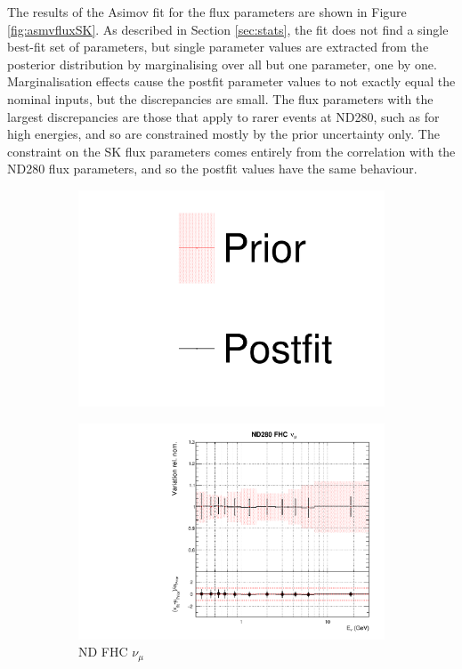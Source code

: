 The results of the Asimov fit for the flux parameters are shown in Figure \ref{fig:asmvfluxSK}. As described in Section \ref{sec:stats}, the fit does not find a single best-fit set of parameters, but single parameter values are extracted from the posterior distribution by marginalising over all but one parameter, one by one. Marginalisation effects cause the postfit parameter values to not exactly equal the nominal inputs, but the discrepancies are small. The flux parameters with the largest discrepancies are those that apply to rarer events at ND280, such as for high energies, and so are constrained mostly by the prior uncertainty only. The constraint on the SK flux parameters comes entirely from the correlation with the ND280 flux parameters, and so the postfit values have the same behaviour.

\begin{figure}
\centering
\begin{subfigure}{0.95\textwidth}
  \centering
  \includegraphics[width=0.24\linewidth]{figs/asmv_leg}
\end{subfigure}
\begin{subfigure}{0.24\textwidth}
  \centering
  \includegraphics[width=0.95\linewidth]{figs/asmvflux0}
  \caption{ND FHC $\nu_{\mu}$}
\end{subfigure}
\begin{subfigure}{0.24\textwidth}
  \centering

\end{subfigure}
\end{figure}
